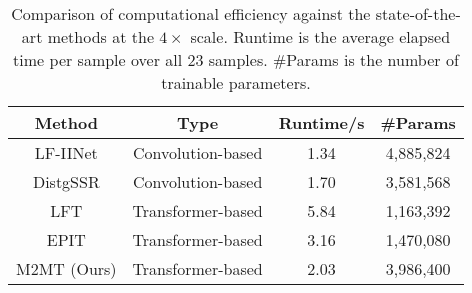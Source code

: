 \begin{table}[ht]
    \centering
    \caption{Comparison of computational efficiency against the state-of-the-art methods at the $4 \times$ scale. Runtime is the average elapsed time per sample over all 23 samples. \#Params is the number of trainable parameters.}
    \label{tab:efficiency}
    
    \begin{tabular}{|c|c|c|c|}
    \hline

    Method                                  & Type                  & Runtime/s   & \#Params   \\ \hline
    LF-IINet \cite{liuLFIINet_TMM2021}      & Convolution-based     & 1.34        & 4,885,824 \\
    DistgSSR \cite{wangDistgSSR_TIP2022}    & Convolution-based     & 1.70        & 3,581,568 \\
    LFT \cite{liangLFT_SPL2022}             & Transformer-based     & 5.84        & 1,163,392 \\
    EPIT \cite{liangEPIT_arXiv2023}         & Transformer-based     & 3.16        & 1,470,080 \\
    M2MT (Ours)                             & Transformer-based     & 2.03        & 3,986,400 \\
    \hline
    
    \end{tabular}
\end{table}